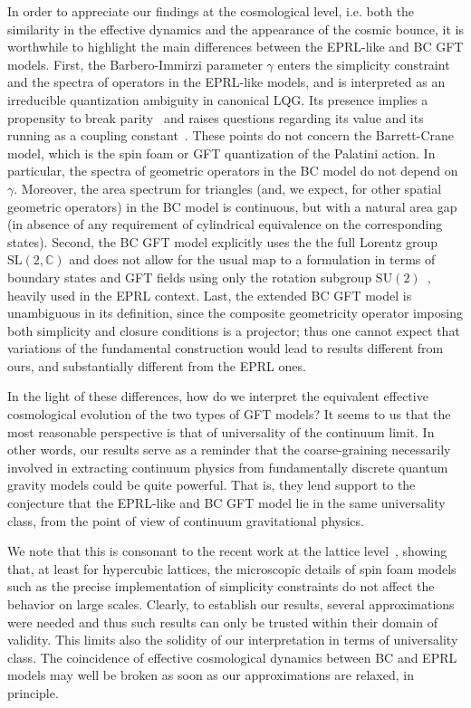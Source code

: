 \documentclass[11pt,a4paper]{article}
\newcommand{\C}{\mathbb C}
\newcommand{\SU}{\text{SU$(2)$}}
\newcommand{\SL}{\text{SL$(2,\C)$}}
\begin{document}
\newline\indent In order to appreciate our findings at the cosmological level, i.e. both the similarity in the effective dynamics and the appearance of the cosmic bounce, it is worthwhile to highlight the main differences between the EPRL-like and BC GFT models. First, the Barbero-Immirzi parameter $\gamma$ enters the simplicity constraint and the spectra of operators in the EPRL-like models, and is interpreted as an irreducible quantization ambiguity in canonical LQG. Its presence implies a propensity to break parity~\cite{Ashtekar:1988sw,Freidel:2005sn,Contaldi:2008yz} and raises questions regarding its value and its running as a coupling constant~\cite{Benedetti:2011yb,Charles:2016mjn}. These points do not concern the Barrett-Crane model, which is the spin foam or GFT quantization of the Palatini action. In particular, the spectra of geometric operators in the BC model do not depend on $\gamma$. Moreover, the area spectrum for triangles (and, we expect, for other spatial geometric operators) in the BC model is continuous, but with a natural area gap (in absence of any requirement of cylindrical equivalence on the corresponding states). Second, the BC GFT model explicitly uses the the full Lorentz group $\SL$ and does not allow for the usual map to a formulation in terms of boundary states and GFT fields using only the rotation subgroup $\SU$~\cite{Finocchiaro:2020xwr}, heavily used in the EPRL context. Last, the extended BC GFT model is unambiguous in its definition, since the composite geometricity operator imposing both simplicity and closure conditions is a projector; thus one cannot expect that variations of the fundamental construction would lead to results different from ours, and substantially different from the EPRL ones.  

In the light of these differences, how do we interpret the equivalent effective cosmological evolution of the two types of GFT models? It seems to us that the most reasonable perspective is that of universality of the continuum limit. In other words, our results serve as a reminder that the coarse-graining necessarily involved in extracting continuum physics from fundamentally discrete quantum gravity models could be quite powerful. That is, they lend support to the conjecture that the EPRL-like and BC GFT model lie in the same universality class, from the point of view of continuum gravitational physics. 

We note that this is consonant to the recent work at the lattice level~\cite{Dittrich:2021kzs}, showing that, at least for hypercubic lattices, the microscopic details of spin foam models such as the precise implementation of simplicity constraints do not affect the behavior on large scales.
\newline
\newline\indent Clearly, to establish our results, several approximations were needed and thus such results can only be trusted within their domain of validity. This limits also the solidity of our interpretation in terms of universality class. The coincidence of effective cosmological dynamics between BC and EPRL models may well be broken as soon as our approximations are relaxed, in principle.
\end{document}
